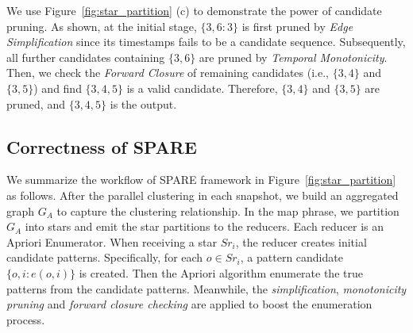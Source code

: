 \begin{example}
We use Figure~\ref{fig:star_partition} (c) to 
demonstrate the power of candidate pruning. 
As shown, at the initial stage, $\{3,6:3\}$ is first pruned by \textit{Edge Simplification} since its
timestamps fails to be a candidate sequence. Subsequently, all further candidates containing $\{3,6\}$ 
are pruned by \textit{Temporal Monotonicity}. Then, we check the \textit{Forward Closure} 
of remaining candidates (i.e., $\{3,4\}$ and $\{3,5\}$) and find $\{3,4,5\}$ is a
valid candidate. Therefore, $\{3,4\}$ and $\{3,5\}$ are pruned, and $\{3,4,5\}$ is the output.
\end{example}






\subsection{Correctness of SPARE}
We summarize the workflow of SPARE framework in Figure~\ref{fig:star_partition} as follows. After the parallel clustering in each snapshot, we build an aggregated graph $G_A$ to capture the clustering relationship. In the map phrase, we partition $G_A$ into stars and emit the star partitions to the reducers. Each reducer is an Apriori Enumerator. When receiving a star $Sr_i$, the reducer creates initial candidate patterns. Specifically, for each $o \in Sr_i$, a pattern candidate $\{o,i: e(o,i)\}$ is created. Then the Apriori algorithm enumerate the true patterns from the candidate patterns. Meanwhile, the \emph{simplification}, \emph{monotonicity pruning} and \emph{forward closure checking} are applied to boost the enumeration process.





